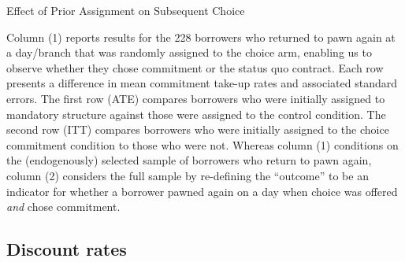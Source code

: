 \begin{appendix}
\begin{table}[H]
        \caption{Effect of Prior Assignment on Subsequent Choice}
    \label{learning_table}
\begin{center}
\footnotesize{}
\end{center}
 \footnotesize{Column (1) reports results for the 228 borrowers who returned to pawn again at a day/branch that was randomly assigned to the choice arm, enabling us to observe whether they chose commitment or the status quo contract.
Each row presents a difference in mean commitment take-up rates and associated standard errors.
The first row (ATE) compares borrowers who were initially assigned to mandatory structure against those were assigned to the control condition.
The second row (ITT) compares borrowers who were initially assigned to the choice commitment condition to those who were not.
Whereas column (1) conditions on the (endogenously) selected sample of borrowers who return to pawn again, column (2) considers the full sample by re-defining the ``outcome'' to be an indicator for whether a borrower pawned again on a day when choice was offered \emph{and} chose commitment.}


\end{table}
\normalsize
\normalsize

\newpage

\subsection{Discount rates}



\end{appendix}
